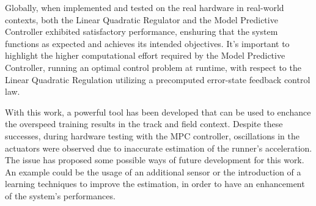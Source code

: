 \documentclass[a4paper,12pt,oneside]{book}
\begin{document}
Globally, when implemented and tested on the real hardware in real-world contexts, both the Linear Quadratic Regulator and the Model Predictive Controller exhibited satisfactory performance, enshuring that the system functions as expected and achieves its intended objectives.
It's important to highlight the higher computational effort required by the Model Predictive Controller, running an optimal control 
problem at runtime, with respect to the Linear Quadratic Regulation utilizing a precomputed error-state feedback control law.

With this work, a powerful tool has been developed that can be used to enchance the overspeed training results in the track and field context.
Despite these successes, during hardware testing with the MPC controller, oscillations in the actuators were observed due to inaccurate estimation of the runner's acceleration. 
The issue has proposed some possible ways of future development for this work.
An example could be the usage of an additional sensor or the introduction of a learning techniques to improve the estimation, in order to have an enhancement of the system's performances.


	





\printbibliography



\newpage
\end{document}
